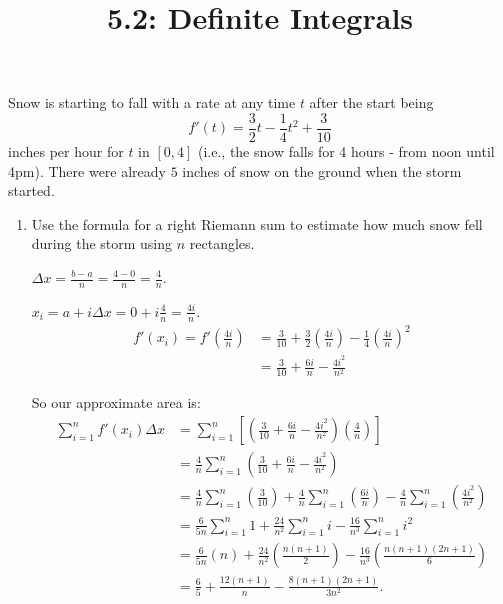 \documentclass[ nooutcomes]{ximera}
\title{5.2: Definite Integrals}
\begin{document}
\begin{abstract}

\end{abstract}
\maketitle




\begin{problem}
Snow is starting to fall with a rate at any time $t$ after the start being 
$$ f'(t) = \frac{3}{2} t - \frac{1}{4} t^2 + \frac{3}{10} $$
inches per hour for $t$ in $[0,4]$ (i.e., the snow falls for 4 hours - from noon until 4pm).  
There were already $5$ inches of snow on the ground when the storm started.  
	\begin{enumerate}
	
	\item  Use the formula for a right Riemann sum to estimate how much snow fell during the storm using $n$ rectangles.
		\begin{freeResponse}
		$\Delta x = \frac{b-a}{n} = \frac{4-0}{n} = \frac{4}{n}$.
		
		$x_i = a + i \Delta x = 0 + i \frac{4}{n} = \frac{4i}{n}$.
			\begin{align*}
			f'(x_i) = f' \left( \frac{4i}{n} \right) &= \frac{3}{10} + \frac{3}{2} \left( \frac{4i}{n} \right) - \frac{1}{4} \left( \frac{4i}{n} \right)^2  \\
			&= \frac{3}{10} + \frac{6i}{n} - \frac{4i^2}{n^2}
			\end{align*}
			
		So our approximate area is:
			\begin{align*}
			\sum_{i=1}^n f'(x_i) \Delta x &= \sum_{i=1}^n \left[ \left( \frac{3}{10} + \frac{6i}{n} - \frac{4i^2}{n^2} \right) \left( \frac{4}{n} \right) \right]  \\
			&= \frac{4}{n} \sum_{i=1}^n \left( \frac{3}{10} + \frac{6i}{n} - \frac{4i^2}{n^2} \right)  \\
			&= \frac{4}{n} \sum_{i=1}^n \left( \frac{3}{10} \right) + \frac{4}{n} \sum_{i=1}^n \left( \frac{6i}{n} \right) - \frac{4}{n} \sum_{i=1}^n \left( \frac{4i^2}{n^2} \right)  \\
			&= \frac{6}{5n} \sum_{i=1}^n 1 + \frac{24}{n^2} \sum_{i=1}^n i - \frac{16}{n^3} \sum_{i=1}^n i^2  \\
			&= \frac{6}{5n} (n) + \frac{24}{n^2} \left( \frac{n(n+1)}{2} \right) - \frac{16}{n^3} \left( \frac{n(n+1)(2n+1)}{6} \right)  \\
			&= \frac{6}{5} + \frac{12(n+1)}{n} - \frac{8(n+1)(2n+1)}{3n^2}.
			\end{align*}
		\end{freeResponse}
		

\end{enumerate}
\end{problem}
\end{document}
